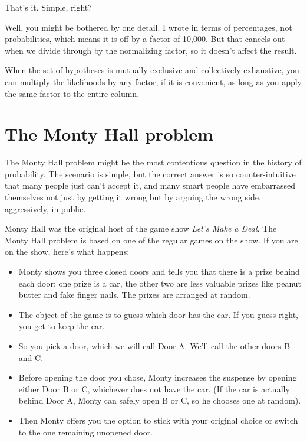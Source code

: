 \documentclass[12pt]{book}
\begin{document}
That's it.  Simple, right?

Well, you might be bothered by one detail.  I wrote 
in terms of percentages, not probabilities, which means it
is off by a factor of 10,000.  But that
cancels out when we divide through by the normalizing factor, so
it doesn't affect the result.

When the set of hypotheses is mutually exclusive and collectively
exhaustive, you can multiply the likelihoods by any factor,
if it is convenient, as long as you apply the same factor to the entire
column.


\section{The Monty Hall problem}

The Monty Hall problem might be the most contentious question in
the history of probability.  The scenario is simple, but the correct
answer is so counter-intuitive that many people just can't accept
it, and many smart people have embarrassed themselves not just by
getting it wrong but by arguing the wrong side, aggressively,
in public.

Monty Hall was the original host of the game show {\em Let's Make a
Deal}.  The Monty Hall problem is based on one of the regular
games on the show.  If you are on the show, here's what happens:

\begin{itemize}

\item Monty shows you three closed doors and tells you that there is a
  prize behind each door: one prize is a car, the other two are less
  valuable prizes like peanut butter and fake finger nails.  The
  prizes are arranged at random.

\item The object of the game is to guess which door has the car.  If
  you guess right, you get to keep the car.

\item So you pick a door, which we will call Door A.  We'll call the
  other doors B and C.

\item Before opening the door you chose, Monty increases the
  suspense by opening either Door B or C, whichever does not
  have the car.  (If the car is actually behind Door A, Monty can
  safely open B or C, so he chooses one at random).

\item Then Monty offers you the option to stick with your original
  choice or switch to the one remaining unopened door.

\end{itemize}
\end{document}
